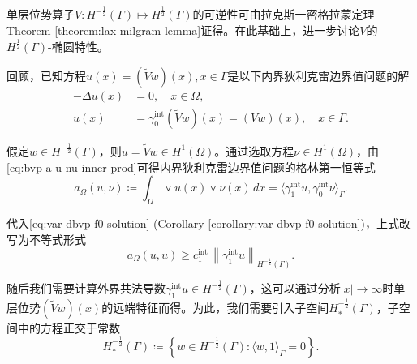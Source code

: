 单层位势算子$V:H^{-\frac{1}{2}}(\Gamma) \mapsto H^{\frac{1}{2}}(\Gamma)$的可逆性可由拉克斯一密格拉蒙定理Theorem \ref{theorem:lax-milgram-lemma}证得。在此基础上，进一步讨论$V$的$H^{\frac{1}{2}}(\Gamma)$-椭圆特性。

回顾，已知方程$u(x) = \left( \widetilde{V} w \right)(x), x \in \Gamma$是以下内界狄利克雷边界值问题的解
\begin{equation*}
  \begin{split}
    - \Delta u (x) &= 0, \quad x \in \Omega, \\
    u(x) &= \gamma_{0}^{\text{int}} \left( \widetilde{V} w \right)(x) = \left( V w \right)(x), \quad x \in \Gamma.
  \end{split}
\end{equation*}

假定$w \in H^{-\frac{1}{2}}(\Gamma)$，则$u = \widetilde{V} w \in H^{1}(\Omega)$。通过选取方程$\nu \in H^{1}(\Omega)$，由\eqref{eq:bvp-a-u-nu-inner-prod}可得内界狄利克雷边界值问题的格林第一恒等式
\begin{equation}
  \label{eq:bvp-bie-interior-dirichlet-green}
  a_{\Omega} (u, \nu) \coloneqq \int_{\Omega} \triangledown u(x) \triangledown \nu(x) \, d x
  = \langle \gamma_{1}^{\text{int}} u, \gamma_{0}^{\text{int}} \nu \rangle_{\Gamma}.
\end{equation}

代入\eqref{eq:var-dbvp-f0-solution} (Corollary \ref{corollary:var-dbvp-f0-solution})，上式改写为不等式形式
\begin{equation}
  \label{eq:bvp-bie-interior-dirichlet-green-ineq}
  a_{\Omega}(u,u) \ge c_{1}^{\text{int}} \,
  \left\| \gamma_{1}^{\text{int}} u \right\|_{H^{-\frac{1}{2}}(\Gamma)}.
\end{equation}

随后我们需要计算外界共法导数$\gamma_{1}^{\text{int}} u \in H^{-\frac{1}{2}}(\Gamma)$，这可以通过分析$\left| x \right| \rightarrow \infty$时单层位势$\left( \widetilde{V} w \right)(x)$的远端特征而得。为此，我们需要引入子空间$H_{*}^{-\frac{1}{2}}(\Gamma)$，子空间中的方程正交于常数
\begin{equation}
  \label{eq:bvp-bie-h-gamma-star-def}
  H_{*}^{-\frac{1}{2}}(\Gamma) \coloneqq
  \left\{
  w \in H^{-\frac{1}{2}}(\Gamma) : \langle w, 1 \rangle_{\Gamma} = 0
  \right\}.
\end{equation}

